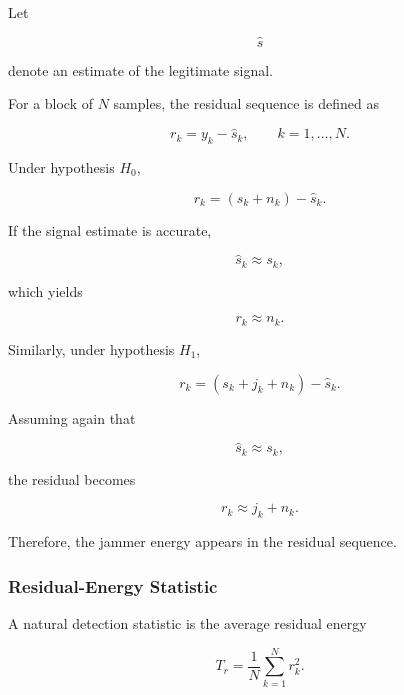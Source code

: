 \documentclass{article}
\begin{document}
Let

\begin{equation}
\hat{s}
\end{equation}

denote an estimate of the legitimate signal.

For a block of $N$ samples, the residual sequence is defined as

\begin{equation}
r_k = y_k - \hat{s}_k,
\qquad k=1,\ldots,N.
\end{equation}

Under hypothesis $H_0$,

\begin{equation}
r_k=(s_k+n_k)-\hat{s}_k.
\end{equation}

If the signal estimate is accurate,

\begin{equation}
\hat{s}_k \approx s_k,
\end{equation}

which yields

\begin{equation}
r_k \approx n_k.
\end{equation}

Similarly, under hypothesis $H_1$,

\begin{equation}
r_k=(s_k+j_k+n_k)-\hat{s}_k.
\end{equation}

Assuming again that

\begin{equation}
\hat{s}_k \approx s_k,
\end{equation}

the residual becomes

\begin{equation}
r_k \approx j_k+n_k.
\end{equation}

Therefore, the jammer energy appears in the residual sequence.

\subsubsection{Residual-Energy Statistic}

A natural detection statistic is the average residual energy

\begin{equation}
T_r
=
\frac{1}{N}
\sum_{k=1}^{N} r_k^2.
\end{equation}
\end{document}

